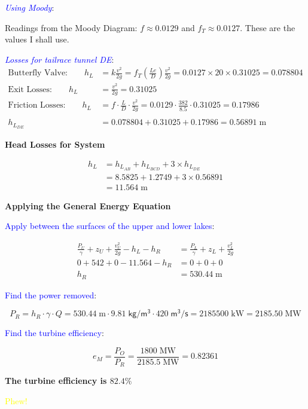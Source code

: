 \documentclass[10pt,oneside]{amsart}
\begin{document}
\textcolor{blue}{\em Using Moody}:

Readings from the Moody Diagram: $f\approx 0.0129$ and $f_T\approx 0.0127$. These are the
values I shall use.

\textcolor{blue}{\em Losses for tailrace tunnel DE}:
\begin{align*}
	\text{Butterfly Valve:}\qquad h_{L} & = k\frac{v^2}{2g} =                            
	f_T\left(\frac{Le}{D}\right)\frac{v^2}{2g}=0.0127\times 20\times 0.31025 = 0.078804\\
	\text{Exit Losses:}\qquad h_{L}     & =  \frac{v^2}{2g} = 0.31025                    \\
	\text{Friction Losses:}\qquad h_{L} & = f\cdot\frac{L}{D} \cdot\frac{v^2}{2g} =      
	0.0129\cdot\frac{382}{8.5}\cdot0.31025 = 0.17986
	\\\\
	h_{L_{DE}}                          & = 0.078804+0.31025+0.17986 = 0.56891\;\text{m} 
\end{align*}

\newpage
\textbf{Head Losses for System}

\begin{align*}
	h_L & = h_{L_{AB}}+h_{L_{BCD}}+3\times h_{L_{DE}} \\
	    & = 8.5825+1.2749+3\times0.56891              \\
	    & = 11.564\;\text{m}                          
\end{align*}

\textbf{Applying the General Energy Equation}

\textcolor{blue}{Apply between the surfaces of the upper and lower lakes}:

\begin{align*}
	\frac{P_U}{\gamma}+z_U+\frac{v_U^2}{2g}-h_L-h_R & = \frac{P_L}{\gamma}+z_L+\frac{v_L^2}{2g} \\
	0+542+0-11.564-h_R                              & = 0+0+0                                   \\
	h_R                                             & = 530.44\;\text{m}                        
\end{align*}

\textcolor{blue}{Find the power removed}:

\[ P_R = h_R \cdot \gamma \cdot Q = 530.44\; \text{m}\cdot9.81\; \mathsf{kg/m^3}\cdot420\; \mathsf{m^3/s} =
	2185500\;\text{kW}=2185.50\;\text{MW}\]
	
	\textcolor{blue}{Find the turbine efficiency}:
	
	\[ e_M = \frac{P_O}{P_R} = \frac{1800\;\text{MW}}{2185.5\;\text{MW}}= 0.82361 \]
	
	\begin{center}
		\textbf{The turbine efficiency is $82.4\%$}
	\end{center}
	
	\textcolor{yellow}{Phew!}
	
	
	
	
	
	
\end{document}
